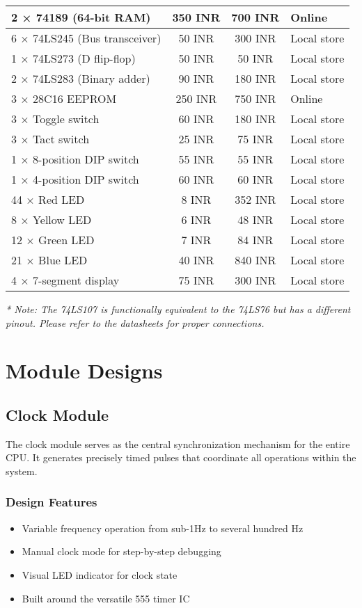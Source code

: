 \documentclass[a4paper,12pt]{article}
\begin{document}
\begin{table}[htbp]
\begin{tabular}{|p{4cm}|c|c|p{2.5cm}|}
\hline
2 × 74189 (64-bit RAM) & 350 INR & 700 INR & Online\\
\hline
6 × 74LS245 (Bus transceiver) & 50 INR & 300 INR & Local store\\
\hline
1 × 74LS273 (D flip-flop) & 50 INR & 50 INR & Local store\\
\hline
2 × 74LS283 (Binary adder) & 90 INR & 180 INR & Local store\\
\hline
3 × 28C16 EEPROM & 250 INR & 750 INR & Online\\
\hline
3 × Toggle switch & 60 INR & 180 INR & Local store\\
\hline
3 × Tact switch & 25 INR & 75 INR & Local store\\
\hline
1 × 8-position DIP switch & 55 INR & 55 INR & Local store\\
\hline
1 × 4-position DIP switch & 60 INR & 60 INR & Local store\\
\hline
44 × Red LED & 8 INR & 352 INR & Local store\\
\hline
8 × Yellow LED & 6 INR & 48 INR & Local store\\
\hline
12 × Green LED & 7 INR & 84 INR & Local store\\
\hline
21 × Blue LED & 40 INR & 840 INR & Local store\\
\hline
4 × 7-segment display & 75 INR & 300 INR & Local store\\
\hline
\end{tabular}
\end{table}

\textit{* Note: The 74LS107 is functionally equivalent to the 74LS76 but has a different pinout. Please refer to the datasheets for proper connections.}

\section{Module Designs}

\subsection{Clock Module}

The clock module serves as the central synchronization mechanism for the entire CPU. It generates precisely timed pulses that coordinate all operations within the system.

\subsubsection{Design Features}
\begin{itemize}
    \item Variable frequency operation from sub-1Hz to several hundred Hz
    \item Manual clock mode for step-by-step debugging
    \item Visual LED indicator for clock state
    \item Built around the versatile 555 timer IC
\end{itemize}
\end{document}
